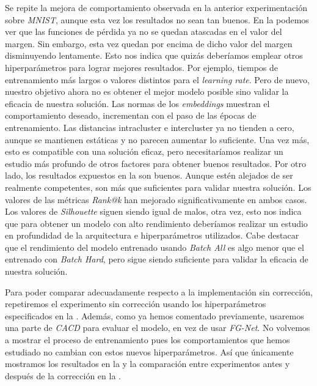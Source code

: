 Se repite la mejora de comportamiento observada en la anterior experimentación sobre \textit{MNIST}, aunque esta vez los resultados no sean tan buenos. En la  podemos ver que las funciones de pérdida ya no se quedan atascadas en el valor del margen. Sin embargo, esta vez quedan por encima de dicho valor del margen disminuyendo lentamente. Esto nos indica que quizás deberíamos emplear otros hiperparámetros para lograr mejores resultados. Por ejemplo, tiempos de entrenamiento más largos o valores distintos para el \textit{learning rate}. Pero de nuevo, nuestro objetivo ahora no es obtener el mejor modelo posible sino validar la eficacia de nuestra solución. Las normas de los \textit{embeddings} muestran el comportamiento deseado, incrementan con el paso de las épocas de entrenamiento. Las distancias intracluster e intercluster ya no tienden a cero, aunque se mantienen estáticas y no parecen aumentar lo suficiente. Una vez más, esto es compatible con una solución eficaz, pero necesitaríamos realizar un estudio más profundo de otros factores para obtener buenos resultados. Por otro lado, los resultados expuestos en la  son buenos. Aunque estén alejados de ser realmente competentes, son más que suficientes para validar nuestra solución. Los valores de las métricas \textit{Rank@k} han mejorado significativamente en ambos casos. Los valores de \textit{Silhouette} siguen siendo igual de malos, otra vez, esto nos indica que para obtener un modelo con alto rendimiento deberíamos realizar un estudio en profundidad de la arquitectura e hiperparámetros utilizados. Cabe destacar que el rendimiento del modelo entrenado usando \textit{Batch All} es algo menor que el entrenado con \textit{Batch Hard}, pero sigue siendo suficiente para validar la eficacia de nuestra solución.

Para poder comparar adecuadamente respecto a la implementación sin corrección, repetiremos el experimento sin corrección usando los hiperparámetros especificados en la . Además, como ya hemos comentado previamente, usaremos una parte de \textit{CACD} para evaluar el modelo, en vez de usar \textit{FG-Net}. No volvemos a mostrar el proceso de entrenamiento pues los comportamientos que hemos estudiado no cambian con estos nuevos hiperparámetros. Así que únicamente mostramos los resultados en la  y la comparación entre experimentos antes y después de la corrección en la .


